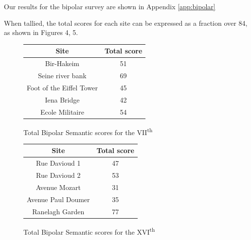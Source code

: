 \documentclass[11pt,letterpaper]{article}
\begin{document}
Our results for the bipolar survey are shown in Appendix \ref{app:bipolar}

When tallied, the total scores for each site can be expressed as a fraction over 84, as shown in Figures 4, 5.

\begin{figure}[H]
    \begin{center}
        \begin{tabular}{||c c||}
            \hline
            Site                     & Total score \\ [0.5ex]
            \hline\hline
            Bir-Hakeim               & 51          \\
            \hline
            Seine river bank         & 69          \\
            \hline
            Foot of the Eiffel Tower & 45          \\
            \hline
            Iena Bridge              & 42          \\
            \hline
            Ecole Militaire          & 54          \\ [1ex]
            \hline
        \end{tabular}
    \end{center}
    \caption{Total Bipolar Semantic scores for the VII\textsuperscript{th}}
\end{figure}

\begin{figure}[H]
    \begin{center}
        \begin{tabular}{||c c||}
            \hline
            Site               & Total score \\ [0.5ex]
            \hline\hline
            Rue Davioud 1      & 47          \\
            \hline
            Rue Davioud 2      & 53          \\
            \hline
            Avenue Mozart      & 31          \\
            \hline
            Avenue Paul Doumer & 35          \\
            \hline
            Ranelagh Garden    & 77          \\ [1ex]
            \hline
        \end{tabular}
    \end{center}
    \caption{Total Bipolar Semantic scores for the XVI\textsuperscript{th}}
\end{figure}
\end{document}
